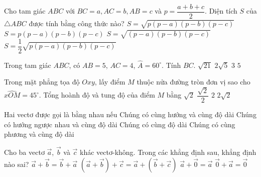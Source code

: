 \begin{ex}%
	Cho tam giác $ABC$ với $BC=a,AC=b,AB=c$ và $p=\dfrac{a+b+c}{2}$. Diện tích $S$ của $\triangle AB C$ được tính bằng công thức nào?
	\choice
	{\True $S=\sqrt{p(p-a)(p-b)(p-c)}$}
	{$S=p(p-a)(p-b)(p-c)$}
	{$S=\sqrt{(p-a)(p-b)(p-c)}$}
	{$S=\dfrac{1}{2}\sqrt{p(p-a)(p-b)(p-c)}$}
\end{ex}

\begin{ex}%
	Trong tam giác $ABC$, có $AB=5$, $AC=4$, $\widehat{A}=60^{\circ}$. Tính $BC$.
	\choice
	{\True $\sqrt{21}$}
	{$2\sqrt{5}$}
	{$3$}
	{$5$}
\end{ex}

\begin{ex}%
	Trong mặt phẳng tọa độ $Oxy$, lấy điểm $M$ thuộc nửa đường tròn đơn vị sao cho $\widehat{xOM}=45^\circ$. Tổng hoành độ và tung độ của điểm $M$ bằng
	\choice
	{\True $\sqrt{2}$}
	{$\dfrac{\sqrt{2}}{2}$}
	{$2$}
	{$2 \sqrt{2}$}

\end{ex}

\begin{ex}%
	Hai vectơ được gọi là bằng nhau nếu
	\choice
	{\True Chúng có cùng hướng và cùng độ dài}
	{Chúng có hướng ngược nhau và cùng độ dài}
	{Chúng có cùng độ dài}
	{Chúng có cùng phương và cùng độ dài}
\end{ex}

\begin{ex}%
	Cho ba vectơ $\overrightarrow{a}$, $\overrightarrow{b}$ và $\overrightarrow{c}$ khác vectơ-không. Trong các khẳng định sau, khẳng định nào sai?
	\choice
	{$\overrightarrow{a}+\overrightarrow{b}=\overrightarrow{b}+\overrightarrow{a}$}
	{$\left (\overrightarrow{a}+\overrightarrow{b}\right )+\overrightarrow{c}=\overrightarrow{a}+\left (\overrightarrow{b}+\overrightarrow{c}\right )$}
	{$\overrightarrow{a}+\overrightarrow{0}=\overrightarrow{a}$}
	{\True  $\overrightarrow{0}+\overrightarrow{a}=\overrightarrow{0}$}
\end{ex}

